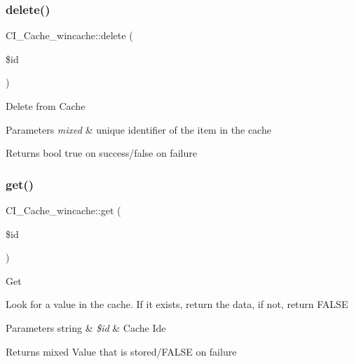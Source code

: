 \subsubsection{\texorpdfstring{delete()}{delete()}}
{\footnotesize\ttfamily C\+I\+\_\+\+Cache\+\_\+wincache\+::delete (\begin{DoxyParamCaption}\item[{}]{\$id }\end{DoxyParamCaption})}

Delete from Cache


\begin{DoxyParams}{Parameters}
{\em mixed} & unique identifier of the item in the cache \\
\hline
\end{DoxyParams}
\begin{DoxyReturn}{Returns}
bool true on success/false on failure 
\end{DoxyReturn}
\mbox{\label{class_c_i___cache__wincache_a167dd867cc9f9fad7b3b45371c9ce7f4}} 
\subsubsection{\texorpdfstring{get()}{get()}}
{\footnotesize\ttfamily C\+I\+\_\+\+Cache\+\_\+wincache\+::get (\begin{DoxyParamCaption}\item[{}]{\$id }\end{DoxyParamCaption})}

Get

Look for a value in the cache. If it exists, return the data, if not, return F\+A\+L\+SE


\begin{DoxyParams}[1]{Parameters}
string & {\em \$id} & Cache Ide \\
\hline
\end{DoxyParams}
\begin{DoxyReturn}{Returns}
mixed Value that is stored/\+F\+A\+L\+SE on failure 
\end{DoxyReturn}
\mbox{\label{class_c_i___cache__wincache_aaa61d1a457bd3db6009761ae059fce2b}} 
